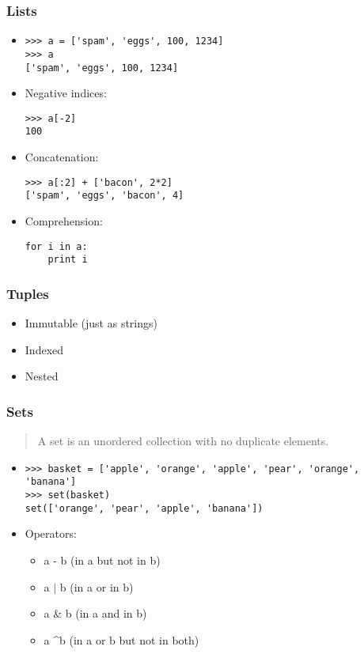 \documentclass{beamer}
\begin{document}
\begin{frame}[fragile]
\frametitle{Lists}
\begin{itemize}

\item<1-> \begin{verbatim}
>>> a = ['spam', 'eggs', 100, 1234]
>>> a
['spam', 'eggs', 100, 1234]
\end{verbatim}

\item<2-> Negative indices:
\begin{verbatim}
>>> a[-2]
100
\end{verbatim}

\item<3-> Concatenation:
\begin{verbatim}
>>> a[:2] + ['bacon', 2*2]
['spam', 'eggs', 'bacon', 4]
\end{verbatim}

\item<4-> Comprehension:
\begin{verbatim}
for i in a:
    print i
\end{verbatim}

\end{itemize}
\end{frame}
\begin{frame}
\frametitle{Tuples}
\begin{itemize}
\item<1-> Immutable (just as strings)
\item<2-> Indexed
\item<3-> Nested
\end{itemize}
\end{frame}

\begin{frame}[fragile]
\frametitle{Sets}
\begin{quote}
A set is an unordered collection with no duplicate elements. 
\end{quote}
\begin{itemize}
\item<2-> \begin{verbatim}
>>> basket = ['apple', 'orange', 'apple', 'pear', 'orange', 'banana']
>>> set(basket)
set(['orange', 'pear', 'apple', 'banana'])
\end{verbatim}
\item<3-> Operators: 
\begin{itemize}
\item<4-> a - b (in a but not in b)
\item<5-> a $\vert$ b (in a or in b)
\item<6-> a \& b (in a and in b)
\item<7-> a \textasciicircum  b (in a or b but not in both)
\end{itemize}
\end{itemize}
\end{frame}
\end{document}
